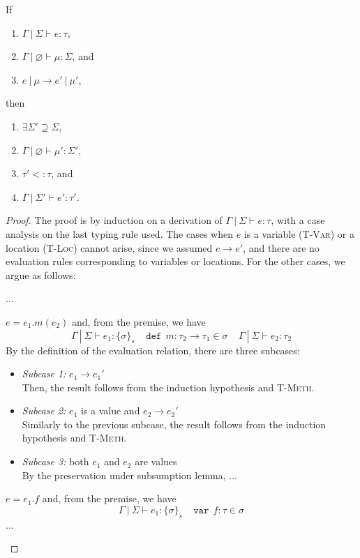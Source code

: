 \documentclass{llncs}
\newcommand{\keywadj}[1]{\mathtt{#1}}
\newcommand{\keyw}[1]{\keywadj{#1}~}
\newcommand{\pcase}[1][]{
  \if\relax\detokenize{#1}\relax
    \def\thiscase{}
  \else
    \def\thiscase{~#1}
  \fi
  \item
}
\begin{document}
\vspace{15pt}

\begin{theorem}[Preservation]
If
\begin{enumerate}
\item $\Gamma~|~\Sigma \vdash e : \tau$,
\item $\Gamma~|~\varnothing \vdash \mu : \Sigma$, and
\item $e~|~\mu \longrightarrow e'~|~\mu'$,
\end{enumerate}
then
\begin{enumerate}
\item $\exists \Sigma' \supseteq \Sigma$,
\item $\Gamma~|~\varnothing \vdash \mu' : \Sigma'$,
\item $\tau'<:\tau$, and
\item $\Gamma~|~\Sigma' \vdash e' : \tau'$.
\end{enumerate}

\end{theorem}

\begin{proof} The proof is by induction on a derivation of $\Gamma~|~\Sigma \vdash e : \tau$, with a case analysis on the last typing rule used. The cases when $e$ is a variable (\textsc{T-Var}) or a location (\textsc{T-Loc}) cannot arise, since we assumed $e \longrightarrow e'$, and there are no evaluation rules corresponding to variables or locations. For the other cases, we argue as follows:

\begin{pcases}
\pcase[\textsc{T-New}] ...
\\
\pcase[\textsc{T-Meth}]
$e = e_1.m(e_2)$ and, from the premise, we have
\[
\Gamma~|~\Sigma \vdash e_1 : \{\sigma\}_s~~~~~\keyw{def}~ m : \tau_2 \rightarrow \tau_1 \in \sigma~~~~~\Gamma~|~\Sigma \vdash e_2 : \tau_2
\]
By the definition of the evaluation relation, there are three subcases:
\\
\begin{itemize}
\item[]  \textit{Subcase 1:} $e_1 \longrightarrow e_1'$
\\
Then, the result follows from the induction hypothesis and \textsc{T-Meth}.
\\
\item[]  \textit{Subcase 2:} $e_1$ is a value and $e_2 \longrightarrow e_2'$
\\
Similarly to the previous subcase, the result follows from the induction hypothesis and \textsc{T-Meth}.
\\
\item[]  \textit{Subcase 3:} both $e_1$ and $e_2$ are values
\\
By the preservation under subsumption lemma, ...
\\
\end{itemize}

\pcase[\textsc{T-Field}]
$e = e_1.f$ and, from the premise, we have
\[
\Gamma~|~\Sigma \vdash e_1 : \{\sigma\}_s~~~~~\keyw{var}~ f : \tau \in \sigma
\]
...
\\
\end{pcases}

\end{proof}
\end{document}
